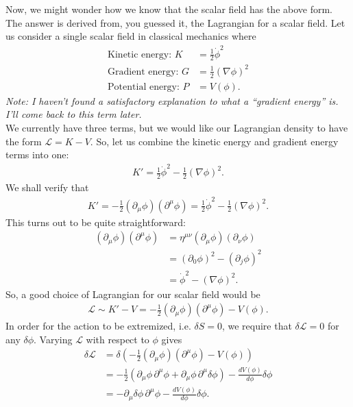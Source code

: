 \documentclass[a4paper,11pt]{article}
\numberwithin{equation}{section}
\theoremstyle{definition}
\begin{document}
Now, we might wonder how we know that the scalar field has the above form. The answer is derived from, you guessed it, the Lagrangian for a scalar field. Let us consider a single scalar field in classical mechanics where
\begin{align*}
\text{Kinetic energy: } K &= \frac{1}{2}\dot{\phi}^2\\
\text{Gradient energy: } G &= \frac{1}{2}\left(\nabla \phi \right)^2\\
\text{Potential energy: } P &= V(\phi).
\end{align*}
\textit{Note: I haven't found a satisfactory explanation to what a ``gradient energy'' is. I'll come back to this term later.} \\

We currently have three terms, but we would like our Lagrangian density to have the form $\mathcal{L} = K-V$. So, let us combine the kinetic energy and gradient energy terms into one:
\begin{align*}
K' = \frac{1}{2}\dot{\phi}^2 - \frac{1}{2}\left(\nabla \phi \right)^2.
\end{align*}
We shall verify that 
\begin{align*}
K' = -\frac{1}{2}\left( \partial_\mu \phi\right)\left( \partial^\mu \phi\right) = \frac{1}{2}\dot{\phi}^2 - \frac{1}{2}\left(\nabla \phi \right)^2.
\end{align*}
This turns out to be quite straightforward:
\begin{align*}
\left( \partial_\mu \phi\right)\left( \partial^\mu \phi\right) &= \eta^{\mu\nu}\left( \partial_\mu \phi\right)\left( \partial_\nu \phi\right)\\
&= \left( \partial_0 \phi \right)^2 - \left(\partial_j\phi \right)^2\\
&= \dot{\phi}^2 - \left( \nabla \phi \right)^2.
\end{align*}
So, a good choice of Lagrangian for our scalar field would be
\begin{align*}
\mathcal{L} \sim K'-V = -\frac{1}{2}\left( \partial_\mu \phi\right)\left( \partial^\mu \phi\right) - V(\phi).
\end{align*}
In order for the action to be extremized, i.e. $\delta S = 0$, we require that $\delta \mathcal{L} = 0$ for any $\delta \phi$. Varying $\mathcal{L}$ with respect to $\phi$ gives
\begin{align*}
\delta \mathcal{L} &= \delta\left( -\frac{1}{2}\left( \partial_\mu \phi\right)\left( \partial^\mu \phi\right) - V(\phi)  \right)\\
&= -\frac{1}{2}\left( \partial_\mu \phi\, \partial^\mu\phi + \partial_\mu\phi\,\partial^\mu\delta \phi \right) - \frac{dV(\phi)}{d\phi}\delta \phi\\
&= -\partial_\mu\delta \phi\, \partial^\mu\phi - \frac{dV(\phi)}{d\phi}\delta \phi.
\end{align*}
\end{document}
